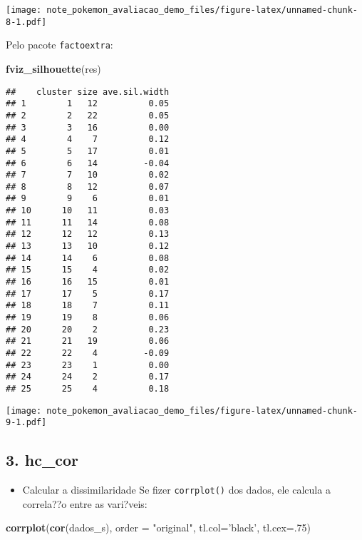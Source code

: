 \documentclass[]{article}
\newenvironment{Shaded}{\begin{snugshade}}{\end{snugshade}}
\newcommand{\DataTypeTok}[1]{\textcolor[rgb]{0.13,0.29,0.53}{#1}}
\newcommand{\DecValTok}[1]{\textcolor[rgb]{0.00,0.00,0.81}{#1}}
\newcommand{\KeywordTok}[1]{\textcolor[rgb]{0.13,0.29,0.53}{\textbf{#1}}}
\newcommand{\NormalTok}[1]{#1}
\newcommand{\StringTok}[1]{\textcolor[rgb]{0.31,0.60,0.02}{#1}}
\providecommand{\tightlist}{%
  \setlength{\itemsep}{0pt}\setlength{\parskip}{0pt}}
\begin{document}
\texttt{[image: note\_pokemon\_avaliacao\_demo\_files/figure-latex/unnamed-chunk-8-1.pdf]}

Pelo pacote \texttt{factoextra}:

\begin{Shaded}
\begin{Highlighting}[]
\KeywordTok{fviz_silhouette}\NormalTok{(res)}
\end{Highlighting}
\end{Shaded}

\begin{verbatim}
##    cluster size ave.sil.width
## 1        1   12          0.05
## 2        2   22          0.05
## 3        3   16          0.00
## 4        4    7          0.12
## 5        5   17          0.01
## 6        6   14         -0.04
## 7        7   10          0.02
## 8        8   12          0.07
## 9        9    6          0.01
## 10      10   11          0.03
## 11      11   14          0.08
## 12      12   12          0.13
## 13      13   10          0.12
## 14      14    6          0.08
## 15      15    4          0.02
## 16      16   15          0.01
## 17      17    5          0.17
## 18      18    7          0.11
## 19      19    8          0.06
## 20      20    2          0.23
## 21      21   19          0.06
## 22      22    4         -0.09
## 23      23    1          0.00
## 24      24    2          0.17
## 25      25    4          0.18
\end{verbatim}

\texttt{[image: note\_pokemon\_avaliacao\_demo\_files/figure-latex/unnamed-chunk-9-1.pdf]}

\hypertarget{hc_cor}{%
\subsection{3. hc\_cor}\label{hc_cor}}

\begin{itemize}
\tightlist
\item
  Calcular a dissimilaridade Se fizer \texttt{corrplot()} dos dados, ele
  calcula a correla??o entre as vari?veis:
\end{itemize}

\begin{Shaded}
\begin{Highlighting}[]
\KeywordTok{corrplot}\NormalTok{(}\KeywordTok{cor}\NormalTok{(dados_s), }\DataTypeTok{order =} \StringTok{"original"}\NormalTok{, }\DataTypeTok{tl.col=}\StringTok{'black'}\NormalTok{, }\DataTypeTok{tl.cex=}\NormalTok{.}\DecValTok{75}\NormalTok{) }
\end{Highlighting}
\end{Shaded}
\end{document}

